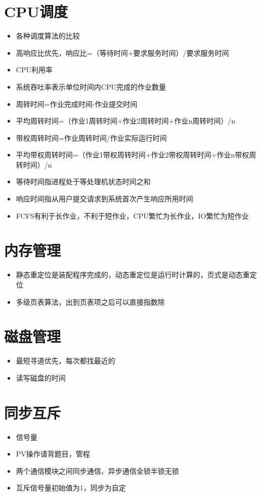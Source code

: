 \documentclass[UTF8]{ctexart}
\begin{document}
\section{CPU调度}
\begin{itemize}
	\item 各种调度算法的比较
	\item 高响应比优先，响应比=（等待时间+要求服务时间）/要求服务时间
	\item CPU利用率
	\item 系统吞吐率表示单位时间内CPU完成的作业数量
	\item 周转时间=作业完成时间-作业提交时间
	\item 平均周转时间=（作业1周转时间+作业2周转时间+作业n周转时间）/n
	\item 带权周转时间=作业周转时间/作业实际运行时间
	\item 平均带权周转时间=（作业1带权周转时间+作业2带权周转时间+作业n带权周转时间）/n
	\item 等待时间指进程处于等处理机状态时间之和
	\item 响应时间指从用户提交请求到系统首次产生响应所用时间
	\item FCFS有利于长作业，不利于短作业，CPU繁忙为长作业，IO繁忙为短作业
\end{itemize}

\section{内存管理}
\begin{itemize}
	\item 静态重定位是装配程序完成的，动态重定位是运行时计算的，页式是动态重定位
	\item 多级页表算法，出到页表项之后可以直接指数除
\end{itemize}

\section{磁盘管理}
\begin{itemize}
	\item 最短寻道优先，每次都找最近的
	\item 读写磁盘的时间
\end{itemize}


\section{同步互斥}
\begin{itemize}
	\item 信号量
	\item PV操作请背题目，管程
	\item 两个通信模块之间同步通信、异步通信全锁半锁无锁
	\item 互斥信号量初始值为1，同步为自定
\end{itemize}
\end{document}
